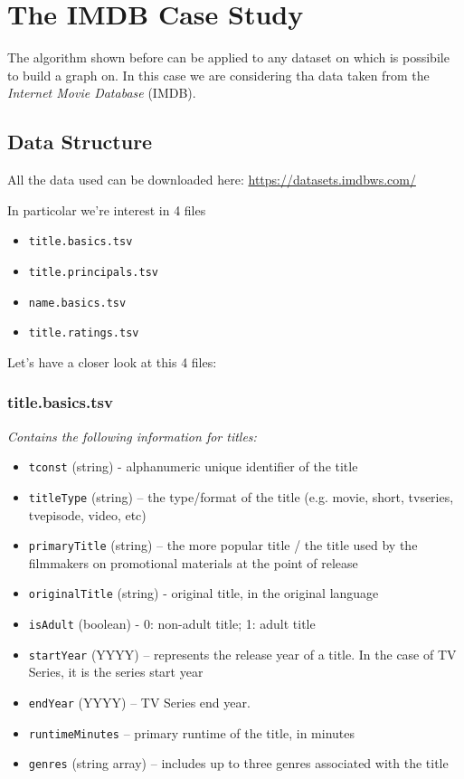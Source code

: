 \section{The IMDB Case Study}
The algorithm shown before can be applied to any dataset on which is possibile to build a graph on. In this case we are considering tha data taken from the \emph{Internet Movie Database} (IMDB).

\subsection{Data Structure}
All the data used can be downloaded here: \url{https://datasets.imdbws.com/} \s

\noindent In particolar we're interest in 4 files
\begin{itemize}
    \item \texttt{title.basics.tsv}
    \item \texttt{title.principals.tsv}
    \item \texttt{name.basics.tsv}
    \item \texttt{title.ratings.tsv}
\end{itemize}
Let's have a closer look at this 4 files:

\subsubsection*{title.basics.tsv}
\emph{Contains the following information for titles:}
\begin{itemize}
    \item \texttt{tconst} (string) - alphanumeric unique identifier of the title
    \item \texttt{titleType} (string) – the type/format of the title (e.g. movie, short, tvseries, tvepisode, video, etc)
    \item \texttt{primaryTitle} (string) – the more popular title / the title used by the filmmakers on promotional materials at the point of release
    \item \texttt{originalTitle} (string) - original title, in the original language
    \item \texttt{isAdult} (boolean) - 0: non-adult title; 1: adult title
    \item \texttt{startYear} (YYYY) – represents the release year of a title. In the case of TV Series, it is the series start year
    \item \texttt{endYear} (YYYY) – TV Series end year.
    \item \texttt{runtimeMinutes} – primary runtime of the title, in minutes
    \item \texttt{genres} (string array) – includes up to three genres associated with the title
\end{itemize}

